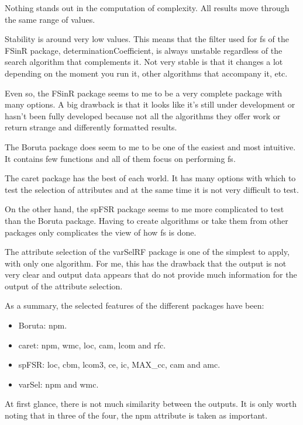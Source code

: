 Nothing stands out in the computation of complexity. All results move through the same range of values.

Stability is around very low values. This means that the filter used for \acrshort{fs} of the FSinR package, determinationCoefficient, is always unstable regardless of the search algorithm that complements it. Not very stable is that it changes a lot depending on the moment you run it, other algorithms that accompany it, etc.

Even so, the FSinR package seems to me to be a very complete package with many options. A big drawback is that it looks like it's still under development or hasn't been fully developed because not all the algorithms they offer work or return strange and differently formatted results.

The Boruta package does seem to me to be one of the easiest and most intuitive. It contains few functions and all of them focus on performing \acrshort{fs}.

The \acrshort{caret} package has the best of each world. It has many options with which to test the selection of attributes and at the same time it is not very difficult to test. 

On the other hand, the spFSR package seems to me more complicated to test than the Boruta package. Having to create algorithms or take them from other packages only complicates the view of how \acrshort{fs} is done.

The attribute selection of the varSelRF package is one of the simplest to apply, with only one algorithm. For me, this has the drawback that the output is not very clear and output data appears that do not provide much information for the output of the attribute selection.

As a summary, the selected features of the different packages have been:

\begin{itemize}
    \item Boruta: \acrshort{npm}.
    
    \item \acrshort{caret}: \acrshort{npm}, \acrshort{wmc}, \acrshort{loc}, \acrshort{cam}, \acrshort{lcom} and \acrshort{rfc}.
    
    \item spFSR: \acrshort{loc}, \acrshort{cbm}, \acrshort{lcom3}, \acrshort{ce}, \acrshort{ic}, MAX\_\acrshort{cc}, \acrshort{cam} and \acrshort{amc}.
    
    \item varSel: \acrshort{npm} and \acrshort{wmc}.
\end{itemize}

At first glance, there is not much similarity between the outputs. It is only worth noting that in three of the four, the \acrshort{npm} attribute is taken as important.